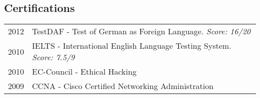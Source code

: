 \subsection{Certifications}
\begin{longtable}
	{r|p{13cm}}
	\textsc{2012} & TestDAF - Test of German as Foreign Language. \emph{Score: 16/20} \\
	\textsc{2010} & IELTS - International English Language Testing System. \emph{Score: 7.5/9} \\
	\textsc{2010} & EC-Council - Ethical Hacking\\
	\textsc{2009} & CCNA - Cisco Certified Networking Administration\\
\end{longtable}

